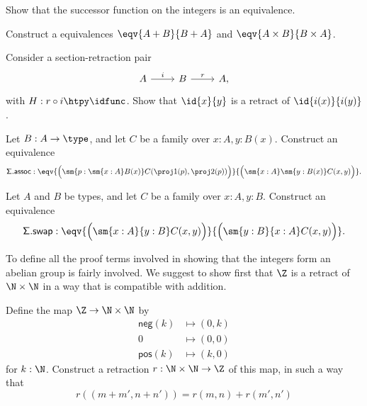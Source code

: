 \begin{exercises}
\item \label{ex:succ_equiv} Show that the successor function on the integers is an equivalence.
\item \label{ex:comm_prod}Construct a equivalences $\eqv{A+B}{B+A}$ and $\eqv{A\times B}{B\times A}$.
\item \label{ex:retr_id} Consider a section-retraction pair
\begin{equation*}
\begin{tikzcd}
A \arrow[r,"i"] & B \arrow[r,"r"] & A,
\end{tikzcd}
\end{equation*}
with $H:r\circ i\htpy \idfunc$. Show that $\id{x}{y}$ is a retract of $\id{i(x)}{i(y)}$.
\item \label{ex:sigma_assoc}Let $B:A\to \type$, and let $C$ be a family over $x:A,y:B(x)$. Construct an equivalence
\begin{equation*}
\mathsf{\Sigma.assoc}:\eqv{\Big(\sm{p:\sm{x:A}B(x)}C(\proj 1(p),\proj 2(p))\Big)}{\Big(\sm{x:A}\sm{y:B(x)}C(x,y)\Big)}.
\end{equation*}
\item \label{ex:sigma_swap}Let $A$ and $B$ be types, and let $C$ be a family over $x:A,y:B$. Construct an equivalence
\begin{equation*}
\mathsf{\Sigma.swap}:\eqv{\Big(\sm{x:A}{y:B}C(x,y)\Big)}{\Big(\sm{y:B}{x:A}C(x,y)\Big)}.
\end{equation*}
\item \label{ex:int_group_laws} To define all the proof terms involved in showing that the integers form an abelian group is fairly involved. We suggest to show first that $\Z$ is a retract of $\N\times\N$ in a way that is compatible with addition.
\begin{subexenum}
\item Define the map $\Z\to\N\times\N$ by
\begin{align*}
\mathsf{neg}(k) & \mapsto (0,k) \\
0 & \mapsto (0,0) \\
\mathsf{pos}(k) & \mapsto (k,0)
\end{align*}
for $k:\N$. Construct a retraction $r:\N\times \N\to \Z$ of this map, in such a way that 
\begin{equation*}
r((m+m',n+n'))=r(m,n)+r(m',n')

\end{equation*}
\end{subexenum}
\end{exercises}
